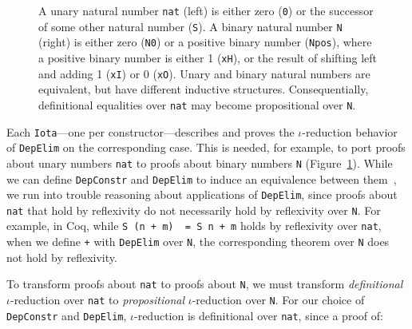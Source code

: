 \begin{figure}
\begin{minipage}{0.44\columnwidth}
   
\end{minipage}
\hfill
\begin{minipage}{0.54\columnwidth}
   
\end{minipage}
\vspace{-0.2cm}
\caption{A unary natural number \lstinline{nat} (left) is either zero (\lstinline{0}) or the successor of some other natural number (\lstinline{S}).
A binary natural number \lstinline{N} (right) is either zero (\lstinline{N0}) or a positive binary number (\lstinline{Npos}), where a positive binary number is either 1 (\lstinline{xH}), or the result of shifting left and adding 1 (\lstinline{xI}) or
0 (\lstinline{xO}). Unary and binary natural numbers are equivalent, but have different inductive structures.
Consequentially, definitional equalities over \lstinline{nat} may become propositional over \lstinline{N}.}
\vspace{-0.2cm}
\label{fig:nattobin}
\end{figure}

Each \lstinline{Iota}---one per constructor---describes and proves the $\iota$-reduction behavior
of \lstinline{DepElim} on the corresponding case.
This is needed, for example, to port proofs about unary numbers \lstinline{nat} to
proofs about binary numbers \lstinline{N} (Figure~\ref{fig:nattobin}).
While we can define \lstinline{DepConstr} and \lstinline{DepElim} to induce an equivalence
between them~\href{https://github.com/uwplse/pumpkin-pi/blob/v2.0.0/plugin/coq/nonorn.v}{}, %
we run into trouble reasoning about applications of \lstinline{DepElim},
since proofs about \lstinline{nat} that hold by reflexivity do not necessarily hold by reflexivity over \lstinline{N}. 
For example, in Coq, while \lstinline{S (n + m)  = S n + m} holds by reflexivity over \lstinline{nat},
when we define \lstinline{+} with \lstinline{DepElim} over \lstinline{N},
the corresponding theorem over \lstinline{N} does not hold by reflexivity.

To transform proofs about \lstinline{nat} to proofs about \lstinline{N}, we must transform \textit{definitional} $\iota$-reduction over \lstinline{nat} to \textit{propositional} $\iota$-reduction over \lstinline{N}.
For our choice of \lstinline{DepConstr} and \lstinline{DepElim},
$\iota$-reduction is definitional over \lstinline{nat}, since a proof of:

